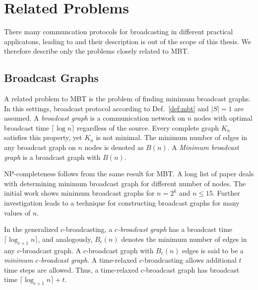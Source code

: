 

\section{Related Problems}

There many communcation protocols for broadcasting in different practical applicatons, leading to  and their description is out of the scope of this thesis.
We therefore describe only the problems closely related to MBT.

\subsection{Broadcast Graphs}

A related problem to MBT is the problem of finding minimum broadcast graphs.
In this settings, broadcast protocol according to Def.~\ref{def:mbt} and  $|S|=1$ are assumed.
A \emph{broadcast graph} is a communication network on $n$ nodes with optimal broadcast time $\lceil \log n\rceil$ regardless of the source.
Every complete graph $K_n$ satisfies this property, yet $K_n$ is not minimal. 
The minimum number of edges in any broadcast graph on $n$ nodes is denoted as $B(n)$.
A \emph{Minimum broadcast graph} is a broadcast graph with $B(n)$.

NP-completeness follows from the same result for MBT.
A long list of paper deals with determining minimum broadcast graph for different number of nodes.
The initial work \cite{farley79} shows minimum broadcast graphs for $n=2^k$ and $n\leq 15$.
Further investigation \cite{harutyunyan99} leads to a technique for constructing broadcast graphs for many values of $n$.

In the generalized $c$-broadcasting, a \emph{$c$-broadcast graph} has a broadcast time $\lceil \log_{c+1} n\rceil$, and analogously, 
$B_c(n)$ denotes the minimum number of edges in any $c$-broadcast graph.
A $c$-broadcast graph with $B_c(n)$ edges is said to be a \emph{minimum $c$-broadcast graph}.
A time-relaxed $c$-broadcasting \cite{mcgarvey16} allows additional $t$ time steps are allowed.
Thus, a time-relaxed $c$-broadcast graph has broadcast time $\lceil \log_{c+1} n\rceil+t$.

